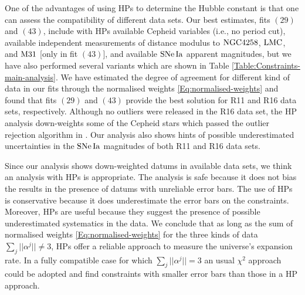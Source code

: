 One of the advantages of using HPs to determine the Hubble constant is that one can assess the compatibility of different data sets. Our best estimates, fits $(29)$ and $(43)$, include with HPs available Cepheid variables (i.e., no period cut), available independent measurements of distance modulus to $\mathrm{NGC4258}$, $\mathrm{LMC}$, and $\mathrm{M31}$ [only in fit $(43)$], and available $\mathrm{SNe\,Ia}$ apparent magnitudes, but we have also performed several variants which are shown in Table \ref{Table:Constraints-main-analysis}. %
We have estimated the degree of agreement for different kind of data in our fits through the normalised weights \eqref{Eq:normalised-weights} and found that fits $(29)$ and $(43)$ provide the best solution for R11 and R16 data sets, respectively. Although no outliers were released in the R16 data set, the HP analysis down-weights some of the Cepheid stars which passed the outlier rejection algorithm in \cite{Riess:2016jrr}. Our analysis also shows hints of possible underestimated uncertainties in the $\mathrm{SNe\,Ia}$ magnitudes of both R11 and R16 data sets.   

Since our analysis shows down-weighted datums in available data sets, we think an analysis with HPs is appropriate. The analysis is safe because it does not bias the results in the presence of datums with unreliable error bars. The use of HPs is conservative because it does underestimate the error bars on the constraints. Moreover, HPs are useful because they suggest the presence of possible underestimated systematics in the data. We conclude that as long as the sum of normalised weights \eqref{Eq:normalised-weights} for the three kinds of data $\sum_j || \alpha^j || \neq 3$,  HPs offer a reliable approach to measure the universe's expansion rate. In a fully compatible case for which $\sum_j || \alpha^j || = 3$ an usual $\chi^2$ approach could be adopted and find constraints with smaller error bars than those in a HP approach.  

